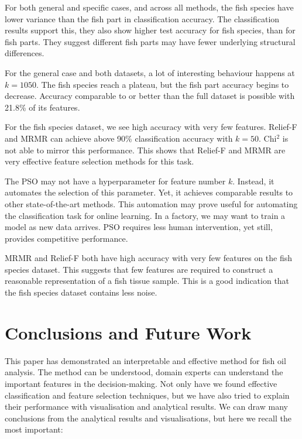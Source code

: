\documentclass[runningheads]{llncs}
\begin{document}
For both general and specific cases, and across all methods, the fish species have lower variance than the fish part in classification accuracy.
The classification results support this, they also show higher test accuracy for fish species, than for fish parts.
They suggest different fish parts may have fewer underlying structural differences.

For the general case and both datasets, a lot of interesting behaviour happens at $k=1050$.
The fish species reach a plateau, but the fish part accuracy begins to decrease.
Accuracy comparable to or better than the full dataset is possible with 21.8\% of its features.

For the fish species dataset, we see high accuracy with very few features.
Relief-F and MRMR can achieve above 90\% classification accuracy with $k = 50$.
Chi$^2$ is not able to mirror this performance.
This shows that Relief-F and MRMR are very effective feature selection methods for this task.

The PSO may not have a hyperparameter for feature number $k$.
Instead, it automates the selection of this parameter.
Yet, it achieves comparable results to other state-of-the-art methods.
This automation may prove useful for automating the classification task for online learning.
In a factory, we may want to train a model as new data arrives.
PSO requires less human intervention, yet still, provides competitive performance.

MRMR and Relief-F both have high accuracy with very few features on the fish species dataset.
This suggests that few features are required to construct a reasonable representation of a fish tissue sample.
This is a good indication that the fish species dataset contains less noise.

\section{Conclusions and Future Work}


This paper has demonstrated an interpretable and effective method for fish oil analysis. 
The method can be understood, domain experts can understand the important features in the decision-making.
Not only have we found effective classification and feature selection techniques, but we have also tried to explain their performance with visualisation and analytical results. 
We can draw many conclusions from the analytical results and visualisations, but here we recall the most important:
\end{document}
